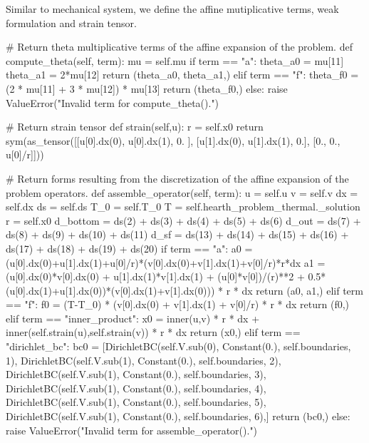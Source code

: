 Similar to mechanical system, we define the affine mutiplicative terms, weak formulation and strain tensor.
\begin{python}
	# Return theta multiplicative terms of the affine expansion of the problem.
	def compute_theta(self, term):
		mu = self.mu
		if term == "a":
			theta_a0 = mu[11]
			theta_a1 = 2*mu[12]
			return (theta_a0, theta_a1,)
		elif term == "f":
			theta_f0 = (2 * mu[11] + 3 * mu[12]) * mu[13]
			return (theta_f0,)
		else:
			raise ValueError("Invalid term for compute_theta().")

	# Return strain tensor
	def strain(self,u):
		r = self.x0
		return sym(as_tensor([[u[0].dx(0), u[0].dx(1), 0. ], [u[1].dx(0), u[1].dx(1), 0.], [0., 0., u[0]/r]]))

	# Return forms resulting from the discretization of the affine expansion of the problem operators.
	def assemble_operator(self, term):
		u = self.u
		v = self.v
		dx = self.dx
		ds = self.ds
		T_0 = self.T_0
		T = self.hearth_problem_thermal._solution
		r = self.x0
		d_bottom = ds(2) + ds(3) + ds(4) + ds(5) + ds(6)
		d_out = ds(7) + ds(8) + ds(9) + ds(10) + ds(11)
		d_sf = ds(13) + ds(14) + ds(15) + ds(16) + ds(17) + ds(18) + ds(19) + ds(20)
		if term == "a":
			a0 = (u[0].dx(0)+u[1].dx(1)+u[0]/r)*(v[0].dx(0)+v[1].dx(1)+v[0]/r)*r*dx
			a1 = (u[0].dx(0)*v[0].dx(0) + u[1].dx(1)*v[1].dx(1) + (u[0]*v[0])/(r)**2 + 0.5*(u[0].dx(1)+u[1].dx(0))*(v[0].dx(1)+v[1].dx(0))) * r * dx
			return (a0, a1,)
		elif term == "f":
			f0 = (T-T_0) * (v[0].dx(0) + v[1].dx(1) + v[0]/r) * r * dx
			return (f0,)
		elif term == "inner_product":
			x0 = inner(u,v) * r * dx + inner(self.strain(u),self.strain(v)) * r * dx
			return (x0,)
		elif term == "dirichlet_bc":
			bc0 = [DirichletBC(self.V.sub(0), Constant(0.), self.boundaries, 1),
				DirichletBC(self.V.sub(1), Constant(0.), self.boundaries, 2),
				DirichletBC(self.V.sub(1), Constant(0.), self.boundaries, 3),
				DirichletBC(self.V.sub(1), Constant(0.), self.boundaries, 4),
				DirichletBC(self.V.sub(1), Constant(0.), self.boundaries, 5),
				DirichletBC(self.V.sub(1), Constant(0.), self.boundaries, 6),]
			return (bc0,)
		else:
			raise ValueError("Invalid term for assemble_operator().")
\end{python}

